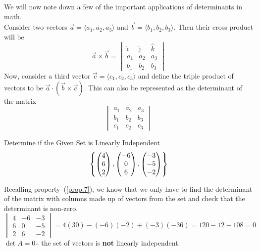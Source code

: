 We will now note down a few of the important applications of determinants in math. \\ Consider two vectors $\vec{a} = \langle a_1, a_2, a_3\rangle$ and $\vec{b} = \langle b_1, b_2, b_3\rangle$. Then their cross product will be 
\[
    \vec{a} \times \vec{b} = \begin{vmatrix}
        \hat{\imath} & \hat{\jmath} & \hat{k} \\
        a_1 & a_2 & a_3 \\
        b_1 & b_2 & b_3
    \end{vmatrix}
\]
Now, consider a third vector $\vec{c} = \langle c_1, c_2, c_3 \rangle$ and define the triple product of vectors to be $\vec{a} \cdot \left(\vec{b} \times \vec{c}\right)$. This can also be represented as the determinant of the matrix 
\[
    \begin{vmatrix}
        a_1 & a_2 & a_3 \\
        b_1 & b_2 & b_3 \\
        c_1 & c_2 & c_3
    \end{vmatrix}
\]

\begin{example}{Determine if the Given Set is Linearly Independent}{}
    \[
        \left\{\begin{pmatrix}
            4 \\ 6 \\ 2
        \end{pmatrix}, \begin{pmatrix}
            -6 \\ 0 \\ 6
        \end{pmatrix}, \begin{pmatrix}
            -3 \\ -5 \\ -2
        \end{pmatrix} \right\} 
    \]
    \begin{solution}
        Recalling property~(\ref{prop:7}), we know that we only have to find the determinant of the matrix with columns made up of vectors from the set and check that the determinant is non-zero. 
        \[
            \begin{vmatrix}
                4 & -6 & -3 \\
                6 & 0 & -5 \\
                2 & 6 & -2
            \end{vmatrix} 
            = 4\left(30\right) - \left(-6\right)\left(-2\right) + \left(-3\right)\left(-36\right) = 120 - 12 - 108 = 0
        \]
        $\det{A} = 0 \therefore$ the set of vectors is \textbf{not} linearly independent.
    \end{solution}
\end{example}